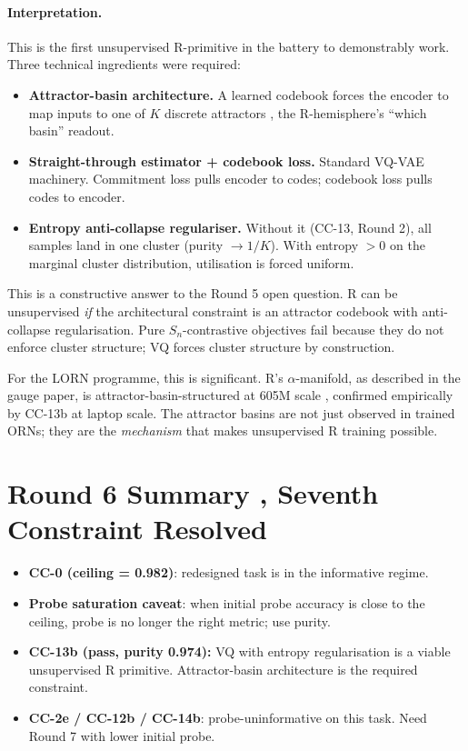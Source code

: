 \documentclass[10pt, twocolumn, a4paper]{article}
\newcommand{\Sn}{S_n}
\begin{document}
\paragraph{Interpretation.} This is the first unsupervised R-primitive in the battery to demonstrably work. Three technical ingredients were required:
\begin{itemize}[nosep]
\item \textbf{Attractor-basin architecture.} A learned codebook forces the encoder to map inputs to one of $K$ discrete attractors ,  the R-hemisphere's ``which basin'' readout.
\item \textbf{Straight-through estimator + codebook loss.} Standard VQ-VAE machinery. Commitment loss pulls encoder to codes; codebook loss pulls codes to encoder.
\item \textbf{Entropy anti-collapse regulariser.} Without it (CC-13, Round 2), all samples land in one cluster (purity $\to 1/K$). With entropy $> 0$ on the marginal cluster distribution, utilisation is forced uniform.
\end{itemize}
This is a constructive answer to the Round 5 open question. R can be unsupervised \emph{if} the architectural constraint is an attractor codebook with anti-collapse regularisation. Pure $\Sn$-contrastive objectives fail because they do not enforce cluster structure; VQ forces cluster structure by construction.

For the LORN programme, this is significant. R's $\alpha$-manifold, as described in the gauge paper, is attractor-basin-structured at 605M scale ,  confirmed empirically by CC-13b at laptop scale. The attractor basins are not just observed in trained ORNs; they are the \emph{mechanism} that makes unsupervised R training possible.


\section{Round 6 Summary ,  Seventh Constraint Resolved}

\begin{itemize}[nosep]
\item \textbf{CC-0 (ceiling = 0.982)}: redesigned task is in the informative regime.
\item \textbf{Probe saturation caveat}: when initial probe accuracy is close to the ceiling, probe is no longer the right metric; use purity.
\item \textbf{CC-13b (pass, purity 0.974):} VQ with entropy regularisation is a viable unsupervised R primitive. Attractor-basin architecture is the required constraint.
\item \textbf{CC-2e / CC-12b / CC-14b}: probe-uninformative on this task. Need Round 7 with lower initial probe.
\end{itemize}
\end{document}
